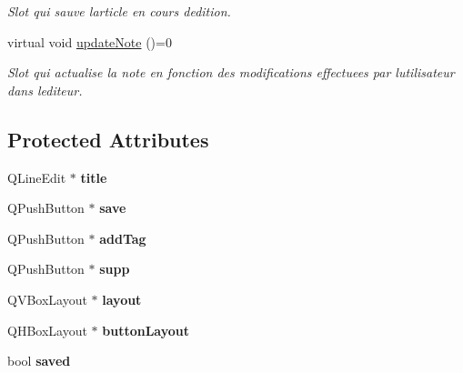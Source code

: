 \begin{DoxyCompactItemize}
\begin{DoxyCompactList}\small\item\em Slot qui sauve l\textquotesingle{}article en cours d\textquotesingle{}edition. \end{DoxyCompactList}\item 
\mbox{\label{class_notes_editeur_af36b50e85106ed8bbfc252ec5af804bc}} 
virtual void \hyperlink{class_notes_editeur_af36b50e85106ed8bbfc252ec5af804bc}{update\+Note} ()=0
\begin{DoxyCompactList}\small\item\em Slot qui actualise la note en fonction des modifications effectuees par l\textquotesingle{}utilisateur dans l\textquotesingle{}editeur. \end{DoxyCompactList}\end{DoxyCompactItemize}
\subsection*{Protected Attributes}
\begin{DoxyCompactItemize}
\item 
\mbox{\label{class_notes_editeur_aa6d34e2d3523f22492d274d5d5817ed7}} 
Q\+Line\+Edit $\ast$ {\bfseries title}
\item 
\mbox{\label{class_notes_editeur_a62f45a1b32bb070f1f4352955613fe65}} 
Q\+Push\+Button $\ast$ {\bfseries save}
\item 
\mbox{\label{class_notes_editeur_af8dc6c1d58252e8d00004c8ab2446c66}} 
Q\+Push\+Button $\ast$ {\bfseries add\+Tag}
\item 
\mbox{\label{class_notes_editeur_a33876d13876a0716242456266b8b5317}} 
Q\+Push\+Button $\ast$ {\bfseries supp}
\item 
\mbox{\label{class_notes_editeur_a62dfed7897a183b6618306943376c195}} 
Q\+V\+Box\+Layout $\ast$ {\bfseries layout}
\item 
\mbox{\label{class_notes_editeur_a49e0297c09f3f507f7922cde81e5bcba}} 
Q\+H\+Box\+Layout $\ast$ {\bfseries button\+Layout}
\item 
\mbox{\label{class_notes_editeur_ac7443ff769c4ed0759ae9e6dac2234ac}} 
bool {\bfseries saved}
\end{DoxyCompactItemize}


